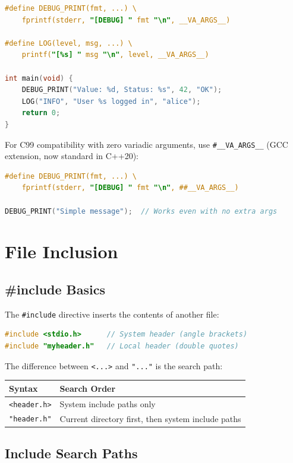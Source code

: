 \begin{lstlisting}[language=C]
#define DEBUG_PRINT(fmt, ...) \
    fprintf(stderr, "[DEBUG] " fmt "\n", __VA_ARGS__)

#define LOG(level, msg, ...) \
    printf("[%s] " msg "\n", level, __VA_ARGS__)

int main(void) {
    DEBUG_PRINT("Value: %d, Status: %s", 42, "OK");
    LOG("INFO", "User %s logged in", "alice");
    return 0;
}
\end{lstlisting}

For C99 compatibility with zero variadic arguments, use \texttt{\#\_\_VA\_ARGS\_\_} (GCC extension, now standard in C++20):

\begin{lstlisting}[language=C]
#define DEBUG_PRINT(fmt, ...) \
    fprintf(stderr, "[DEBUG] " fmt "\n", ##__VA_ARGS__)

DEBUG_PRINT("Simple message");  // Works even with no extra args
\end{lstlisting}

\section{File Inclusion}

\subsection{\#include Basics}

The \texttt{\#include} directive inserts the contents of another file:

\begin{lstlisting}[language=C]
#include <stdio.h>      // System header (angle brackets)
#include "myheader.h"   // Local header (double quotes)
\end{lstlisting}

The difference between \texttt{<...>} and \texttt{"..."} is the search path:

\begin{tabular}{|l|p{10cm}|}
\hline
\textbf{Syntax} & \textbf{Search Order} \\
\hline
\texttt{<header.h>} & System include paths only \\
\hline
\texttt{"header.h"} & Current directory first, then system include paths \\
\hline
\end{tabular}

\subsection{Include Search Paths}

